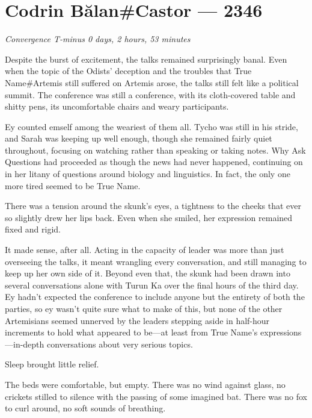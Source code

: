 \hypertarget{codrin-bux103lancastor-2346}{%
\chapter{Codrin Bălan\#Castor — 2346}}

\begin{center}
\emph{Convergence T-minus 0 days, 2 hours, 53 minutes}
\end{center}

\noindent Despite the burst of excitement, the talks remained surprisingly banal. Even when the topic of the Odists' deception and the troubles that True Name\#Artemis still suffered on Artemis arose, the talks still felt like a political summit. The conference was still a conference, with its cloth-covered table and shitty pens, its uncomfortable chairs and weary participants.

Ey counted emself among the weariest of them all. Tycho was still in his stride, and Sarah was keeping up well enough, though she remained fairly quiet throughout, focusing on watching rather than speaking or taking notes. Why Ask Questions had proceeded as though the news had never happened, continuing on in her litany of questions around biology and linguistics. In fact, the only one more tired seemed to be True Name.

There was a tension around the skunk's eyes, a tightness to the cheeks that ever so slightly drew her lips back. Even when she smiled, her expression remained fixed and rigid.

It made sense, after all. Acting in the capacity of leader was more than just overseeing the talks, it meant wrangling every conversation, and still managing to keep up her own side of it. Beyond even that, the skunk had been drawn into several conversations alone with Turun Ka over the final hours of the third day. Ey hadn't expected the conference to include anyone but the entirety of both the parties, so ey wasn't quite sure what to make of this, but none of the other Artemisians seemed unnerved by the leaders stepping aside in half-hour increments to hold what appeared to be—at least from True Name's expressions—in-depth conversations about very serious topics.

Sleep brought little relief.

The beds were comfortable, but empty. There was no wind against glass, no crickets stilled to silence with the passing of some imagined bat. There was no fox to curl around, no soft sounds of breathing.


